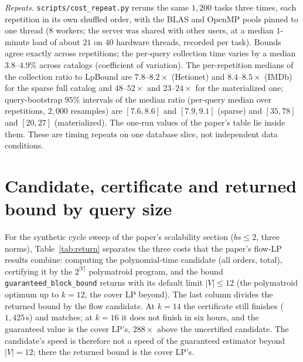\documentclass[11pt]{article}
\begin{document}
\emph{Repeats.} \texttt{scripts/cost\_repeat.py} reruns the same $1{,}200$
tasks three times, each repetition in its own shuffled order, with the
BLAS and OpenMP pools pinned to one thread ($8$ workers; the server was shared
with other users, at a median $1$-minute load of about $21$ on $40$ hardware
threads, recorded per task). Bounds agree exactly across repetitions; the
per-query collection time varies by a median $3.8$--$4.9\%$ across catalogs
(coefficient of variation). The per-repetition medians of the collection ratio to LpBound are
$7.8$--$8.2\times$ (Hetionet) and $8.4$--$8.5\times$ (IMDb) for the sparse full
catalog and $48$--$52\times$ and $23$--$24\times$ for the materialized one;
query-bootstrap $95\%$ intervals of the median ratio (per-query median over
repetitions, $2{,}000$ resamples) are $[7.6, 8.6]$ and $[7.9, 9.1]$ (sparse)
and $[35, 78]$ and $[20, 27]$ (materialized). The one-run values of the
paper's table lie inside them. These are timing repeats on one database
slice, not independent data conditions.

\section{Candidate, certificate and returned bound by query size}
For the synthetic cycle sweep of the paper's scalability section ($bs{\le}2$,
three norms), Table~\ref{tab:return} separates the three costs that the
paper's flow-LP results combine: computing the polynomial-time candidate
(all orders, total), certifying it by the $2^{|V|}$ polymatroid program, and
the bound \texttt{guaranteed\_block\_bound} returns with its default limit
$|V|\le 12$ (the polymatroid optimum up to $k{=}12$, the cover LP beyond).
The last column divides the returned bound by the flow candidate. At
$k{=}14$ the certificate still finishes ($1{,}425$\,s) and matches; at
$k{=}16$ it does not finish in six hours, and the guaranteed value is the
cover LP's, $288\times$ above the uncertified candidate. The candidate's
speed is therefore not a speed of the guaranteed estimator beyond
$|V|{=}12$; there the returned bound is the cover LP's.
\end{document}
